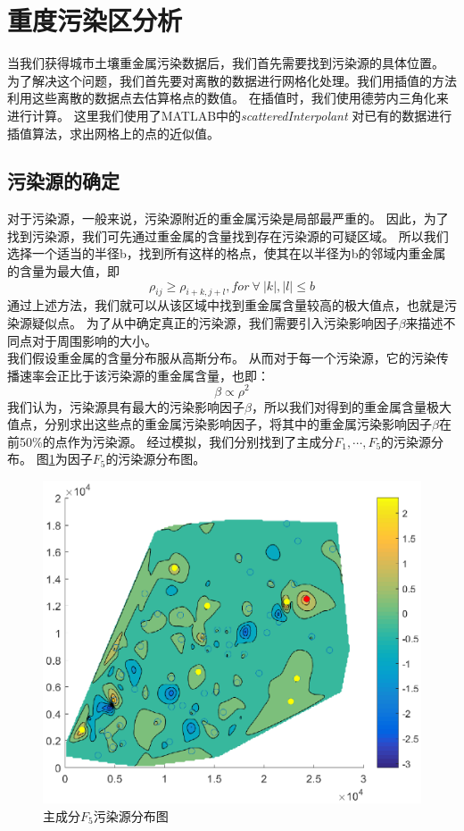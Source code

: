\documentclass[a4paper]{article}
\begin{document}
\section{重度污染区分析}
当我们获得城市土壤重金属污染数据后，我们首先需要找到污染源的具体位置。\\
\indent 为了解决这个问题，我们首先要对离散的数据进行网格化处理。我们用插值的方法利用这些离散的数据点去估算格点的数值。
在插值时，我们使用德劳内三角化来进行计算。
这里我们使用了MATLAB中的\emph{scatteredInterpolant} \cite{journals/jei/Amidror02}对已有的数据进行插值算法，求出网格上的点的近似值。
\subsection{污染源的确定}
对于污染源，一般来说，污染源附近的重金属污染是局部最严重的。
因此，为了找到污染源，我们可先通过重金属的含量找到存在污染源的可疑区域。
所以我们选择一个适当的半径b，找到所有这样的格点，使其在以半径为b的邻域内重金属的含量为最大值，即
\begin{equation}
\rho_{ij} \geq \rho_{i+k, j+l}, for\ \forall \ |k|, |l| \le b
\end{equation}
通过上述方法，我们就可以从该区域中找到重金属含量较高的极大值点，也就是污染源疑似点。
为了从中确定真正的污染源，我们需要引入污染影响因子$\beta$来描述不同点对于周围影响的大小。\\
\indent 我们假设重金属的含量分布服从高斯分布。
从而对于每一个污染源，它的污染传播速率会正比于该污染源的重金属含量，也即：
\begin{equation}
\beta \propto \rho^2
\end{equation}
我们认为，污染源具有最大的污染影响因子$\beta$，所以我们对得到的重金属含量极大值点，分别求出这些点的重金属污染影响因子，将其中的重金属污染影响因子$\beta$在前50\%的点作为污染源。
经过模拟，我们分别找到了主成分$F_1,\cdots,F_5$的污染源分布。
图\ref{fig:polluted-source}为因子$F_5$的污染源分布图。
\begin{figure}
    \centering 
    \includegraphics[scale=0.9]{pictures/polluted-source.eps}
    \caption{主成分$F_5$污染源分布图}
    \label{fig:polluted-source}
\end{figure}
\end{document}
